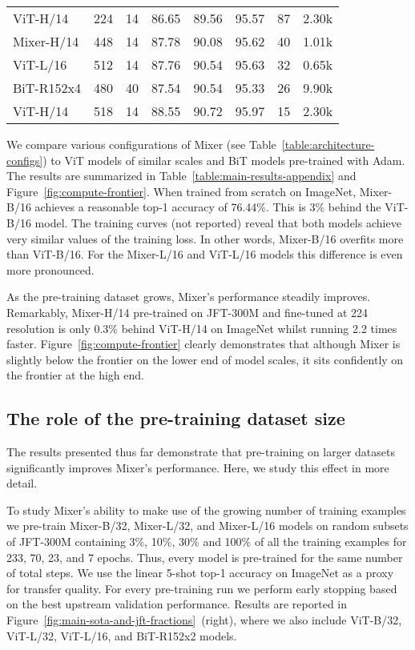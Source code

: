 \documentclass{article}
\newcommand{\MDot}{\raisebox{0.5pt}{\tikz\fill[mixer] (0,0) circle (.5ex);}}
\newcommand{\CDot}{\raisebox{0.5pt}{\tikz\fill[cnn] (0,0) circle (.5ex);}}
\newcommand{\ADot}{\raisebox{0.5pt}{\tikz\fill[attention] (0,0) circle (.5ex);}}
\newcommand{\name}{Mixer}
\begin{document}
\begin{table}[tbp]
\begin{tabular}{@{}lccccc@{\;}S[table-number-alignment=right,group-digits=false,mode=text]@{\;}S[table-number-alignment=left,mode=text]@{}}
    \ADot{} ViT-H/14 & 224 & 14 & 86.65 & 89.56 & 95.57 & 87 & 2.30k\\
    \MDot{} \name{}-H/14 & 448 & 14 & 87.78 & 90.08 & 95.62 & 40 & 1.01k\\
    \ADot{} ViT-L/16 \cite{Dosovitskiy2021} & 512 & 14 & 87.76 & 90.54 & 95.63 & 32 & 0.65k\\
    \CDot{} BiT-R152x4 \cite{kolesnikov2020-bit} & 480 & 40 & 87.54 & 90.54 & 95.33 & 26 & 9.90k\\
    \ADot{} ViT-H/14 \cite{Dosovitskiy2021} & 518 & 14 & 88.55 & 90.72 & 95.97 & 15 & 2.30k\\
    \bottomrule
  \end{tabular}
\end{table}

We compare various configurations of \name{} (see Table~\ref{table:architecture-configs}) to ViT models of similar scales and BiT models pre-trained with Adam. The results are summarized in Table~\ref{table:main-results-appendix} and Figure~\ref{fig:compute-frontier}.
When trained from scratch on ImageNet, \name{}-B/16 achieves a reasonable top-1 accuracy of 76.44\%. This is 3\% behind the ViT-B/16 model. The training curves (not reported) reveal that both models achieve very similar values of the training loss.
In other words, \name{}-B/16 overfits more than ViT-B/16.
For the \name{}-L/16 and ViT-L/16 models this difference is even more pronounced.

As the pre-training dataset grows, \name{}'s performance steadily improves.
Remarkably, \name{}-H/14 pre-trained on JFT-300M and fine-tuned at 224 resolution is only 0.3\% behind ViT-H/14 on ImageNet whilst running 2.2 times faster.
Figure~\ref{fig:compute-frontier} clearly demonstrates that although \name{} is slightly below the frontier on the lower end of model scales, it sits confidently on the frontier at the high end. 

\subsection{The role of the pre-training dataset size}

The results presented thus far demonstrate that pre-training on larger datasets significantly improves \name{}'s performance. Here, we study this effect in more detail.

To study \name{}'s ability to make use of the growing number of training examples we pre-train \name{}-B/32, \name{}-L/32, and \name{}-L/16 models on random subsets of JFT-300M containing 3\%, 10\%, 30\% and 100\% of all the training examples for 233, 70, 23, and 7 epochs. Thus, every model is pre-trained for the same number of total steps.
We use the linear 5-shot top-1 accuracy on ImageNet as a proxy for transfer quality.
For every pre-training run we perform early stopping based on the best upstream validation performance.
Results are reported in Figure~\ref{fig:main-sota-and-jft-fractions}~(right), where we also include ViT-B/32, ViT-L/32, ViT-L/16, and BiT-R152x2 models. 
\end{document}
